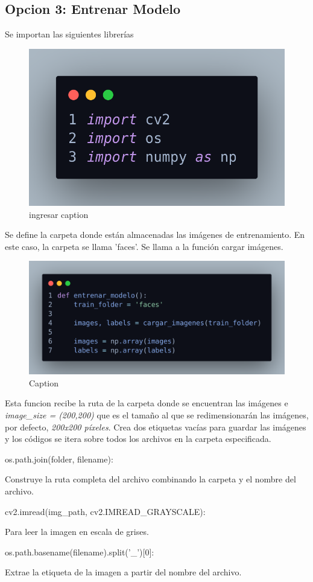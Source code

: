 \documentclass[12pt]{article}
\begin{document}
{\subsection{Opcion 3: Entrenar Modelo}

Se importan las siguientes librerías

\begin{figure}[h]
    \centering
    \includegraphics[width=0.5\linewidth]{imagenes/des17.png}
    \caption{ingresar caption}
    \label{fig:enter-label}
\end{figure}

Se define la carpeta donde están almacenadas las imágenes de entrenamiento. En este caso, la carpeta se llama 'faces'. Se llama a la función cargar imágenes. 

\begin{figure}[h]
    \centering
    \includegraphics[width=0.9\linewidth]{imagenes/des18.png}
    \caption{Caption}
    \label{fig:enter-label}
\end{figure}

Esta funcion recibe la ruta de la carpeta donde se encuentran las imágenes e \textit{image\_size = (200,200)} que es el tamaño al que se redimensionarán las imágenes, por defecto, \textit{200x200 píxeles}. Crea dos etiquetas vacías para guardar las imágenes y los códigos se itera sobre todos los archivos en la carpeta especificada.

\begin{itemize}
    {\bfseries\item os.path.join(folder, filename):} Construye la ruta completa del archivo combinando la carpeta y el nombre del archivo.
    {\bfseries\item cv2.imread(img\_path, cv2.IMREAD\_GRAYSCALE):} Para leer la imagen en escala de grises.
    {\bfseries\item os.path.basename(filename).split('\_')[0]:} Extrae la etiqueta de la imagen a partir del nombre del archivo.
\end{itemize}

}
\end{document}
